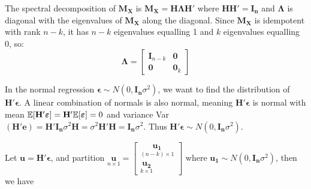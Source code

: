 \documentclass[DIV=14,titlepage=false]{scrreprt}
\begin{document}
The spectral decomposition of $\mathbf{M_X}$ is $\mathbf{M_X}=\mathbf{H}\mathbf{\Lambda}\mathbf{H'}$ where $\mathbf{HH'}=\mathbf{I_n}$ and $\mathbf{\Lambda}$ is diagonal with the eigenvalues of $\mathbf{M_X}$ along the diagonal. Since $\mathbf {M_X}$ is idempotent with rank $n-k$, it has $n-k$ eigenvalues equalling 1 and $k$ eigenvalues equalling 0, so: 
\[\mathbf{\Lambda} = \begin{bmatrix}
    \mathbf{I}_{n-k} & \mathbf{0} \\
    \mathbf{0} & \mathbf{0}_k
    \end{bmatrix} \]
    
In the normal regression $\boldsymbol{\epsilon} \sim N(0,\mathbf{I_n} \sigma^2)$, we want to find the distribution of $\mathbf{H'}\boldsymbol{\epsilon}$. A linear combination of normals is also normal, meaning $\mathbf{H'}\boldsymbol{\epsilon}$ is normal with mean $\mathbb{E}[\mathbf{H'}\boldsymbol{\varepsilon}]=\mathbf{H'}\mathbb{E}[\boldsymbol{\varepsilon}]=0$ and variance Var$(\mathbf{H'}\boldsymbol{e})=\mathbf{H'}\mathbf{I_n} \sigma^2 \mathbf{H} = \sigma^2 \mathbf{H'}\mathbf{H} = \mathbf{I_n} \sigma^2$. Thus $\mathbf{H'}\boldsymbol{\epsilon} \sim N(0,\mathbf{I_n} \sigma^2)$.

Let $\mathbf{u}=\mathbf{H'}\boldsymbol{\epsilon}$, and partition $\underset{n \times 1}{\mathbf{u}}=\begin{bmatrix}
    \underset{(n-k) \times 1}{\mathbf{u_1}}\\
    \underset{k \times 1}{\mathbf{u_2}}
\end{bmatrix}$ where $\mathbf{u_1} \sim N(0,\mathbf{I_n} \sigma^2)$, then we have
\end{document}

